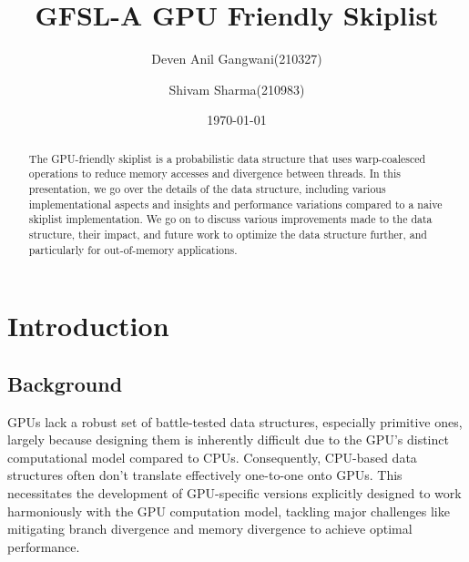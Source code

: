 \documentclass[12pt,a4paper]{article}
\title{\color{titlecolor}\Huge GFSL-A GPU Friendly Skiplist}
\author{Deven Anil Gangwani(210327) \and Shivam Sharma(210983)}
\date{\today}
\begin{document}
\maketitle
\thispagestyle{empty}
\newpage

\begin{abstract}
    \noindent
    The GPU-friendly skiplist is a probabilistic data structure that uses warp-coalesced operations to reduce memory accesses and divergence between threads. In this presentation, we go over the details of the data structure, including various implementational aspects and insights and performance variations compared to a naive skiplist implementation. We go on to discuss various improvements made to the data structure, their impact, and future work to optimize the data structure further, and particularly for out-of-memory applications.
\end{abstract}

\tableofcontents
\newpage

\section{Introduction}

\subsection{Background}
GPUs lack a robust set of battle-tested data structures, especially primitive ones, largely because designing
them is inherently difficult due to the GPU's distinct computational model compared to CPUs. Consequently,
CPU-based data structures often don't translate effectively one-to-one onto GPUs. This necessitates
the development of GPU-specific versions explicitly designed to work harmoniously with the GPU computation model,
tackling major challenges like mitigating branch divergence and memory divergence to achieve optimal performance.
\end{document}
